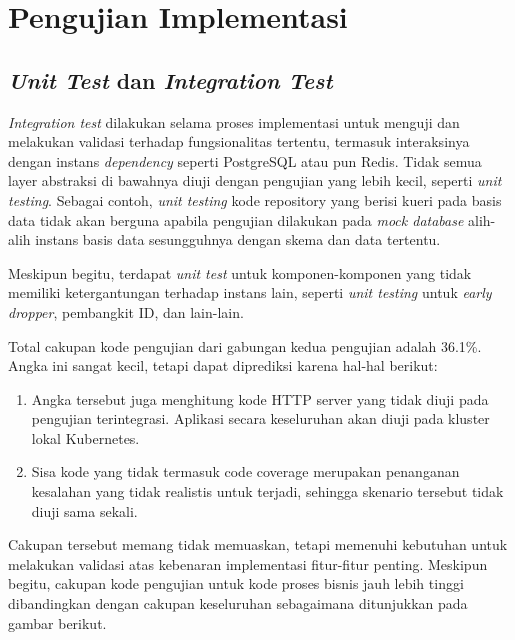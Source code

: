 \chapter{Pengujian Implementasi}
\label{apx:implementation-test}

\section{\textit{Unit Test} dan \textit{Integration Test}}

\textit{Integration test} dilakukan selama proses implementasi untuk menguji dan melakukan validasi terhadap fungsionalitas tertentu, termasuk interaksinya dengan instans \textit{dependency} seperti PostgreSQL atau pun Redis. Tidak semua layer abstraksi di bawahnya diuji dengan pengujian yang lebih kecil, seperti \textit{unit testing}. Sebagai contoh, \textit{unit testing} kode repository yang berisi kueri pada basis data tidak akan berguna apabila pengujian dilakukan pada \textit{mock database} alih-alih instans basis data sesungguhnya dengan skema dan data tertentu.

Meskipun begitu, terdapat \textit{unit test} untuk komponen-komponen yang tidak memiliki ketergantungan terhadap instans lain, seperti \textit{unit testing} untuk \textit{early dropper}, pembangkit ID, dan lain-lain.

Total cakupan kode pengujian dari gabungan kedua pengujian adalah 36.1\%. Angka ini sangat kecil, tetapi dapat diprediksi karena hal-hal berikut:

\begin{enumerate}
    \item Angka tersebut juga menghitung kode HTTP server yang tidak diuji pada pengujian terintegrasi. Aplikasi secara keseluruhan akan diuji pada kluster lokal Kubernetes.
    \item Sisa kode yang tidak termasuk code coverage merupakan penanganan kesalahan yang tidak realistis untuk terjadi, sehingga skenario tersebut tidak diuji sama sekali.
\end{enumerate}

Cakupan tersebut memang tidak memuaskan, tetapi memenuhi kebutuhan untuk melakukan validasi atas kebenaran implementasi fitur-fitur penting. Meskipun begitu, cakupan kode pengujian untuk kode proses bisnis jauh lebih tinggi dibandingkan dengan cakupan keseluruhan sebagaimana ditunjukkan pada gambar berikut.

